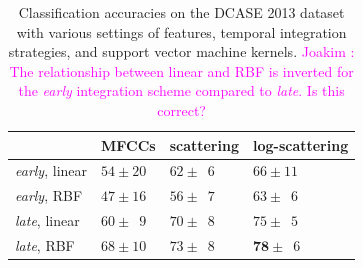 \documentclass[journal]{IEEEtran}
\newcommand{\ja}[1]{\textcolor{magenta}{Joakim : #1}}
\begin{document}
\begin{table}
\begin{center}
\caption{
\label{table:dcase2013}
Classification accuracies on the DCASE 2013 dataset with various settings of features, temporal integration strategies, and support vector machine kernels.
\ja{The relationship between linear and RBF is inverted for the \emph{early} integration scheme compared to \emph{late}. Is this correct?}
}
\begin{tabular}{llll}
             & MFCCs         & scattering & log-scattering  \\
             \hline
\emph{early}, linear  & $54\pm20$   & $62\pm\phantom{0}6$  & $66\pm11$     \\
\emph{early}, RBF     & $47\pm16$  & $56\pm\phantom{0}7$  & $63\pm\phantom{0}6$   \\
\emph{late}, linear  & $60\pm\phantom{0}9$ & $70\pm\phantom{0}8$  & $75\pm\phantom{0}5$   \\
\emph{late}, RBF     & $68\pm10$ & $73\pm\phantom{0}8$  & $\mathbf{78}\pm\phantom{0}6$   \\
\end{tabular}
\end{center}
\end{table}
\end{document}
